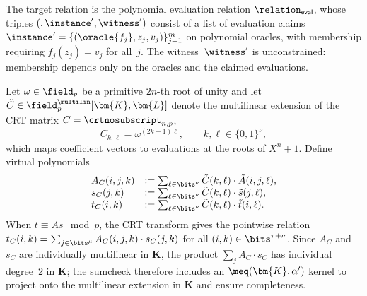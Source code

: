 The target relation is the polynomial evaluation relation $\relation_{\mathsf{eval}}$, whose triples $(\index', \instance', \witness')$ consist of a list of evaluation claims $\instance' = \{(\oracle{f_j}, z_j, v_j)\}_{j=1}^m$ on polynomial oracles, with membership requiring $f_j(z_j) = v_j$ for all~$j$. The witness~$\witness'$ is unconstrained: membership depends only on the oracles and the claimed evaluations.

Let $\omega \in \field_p$ be a primitive $2n$-th root of unity and let $\tilde{C} \in \field_p^{\multilin}[\bm{K},\bm{L}]$ denote the multilinear extension of the CRT matrix $C = \crtnosubscript_{n,p}$,
\[
    C_{k,\ell} = \omega^{(2k+1)\ell}, \qquad k,\ell \in \{0,1\}^\nu,
\]
which maps coefficient vectors to evaluations at the roots of $X^n + 1$. Define virtual polynomials
\[
    \begin{array}{ll}
    A_C(i,j,k) &:= \sum_{\ell \in \bits^\nu} \tilde{C}(k,\ell)\cdot\tilde{A}(i,j,\ell), \\
    s_C(j,k) &:= \sum_{\ell \in \bits^\nu} \tilde{C}(k,\ell)\cdot\tilde{s}(j,\ell), \\
    t_C(i,k) &:= \sum_{\ell \in \bits^\nu} \tilde{C}(k,\ell)\cdot\tilde{t}(i,\ell).
    \end{array}
\]
When $t \equiv A s \mod p$, the CRT transform gives the pointwise relation $t_C(i,k) = \sum_{j \in \bits^\mu} A_{C}(i,j,k)\cdot s_{C}(j,k)$ for all $(i,k) \in \bits^{\tau+\nu}$. Since $A_C$ and $s_C$ are individually multilinear in $\bm{K}$, the product $\sum_j A_C \cdot s_C$ has individual degree~$2$ in $\bm{K}$; the sumcheck therefore includes an $\meq(\bm{K},\alpha')$ kernel to project onto the multilinear extension in $\bm{K}$ and ensure completeness.

